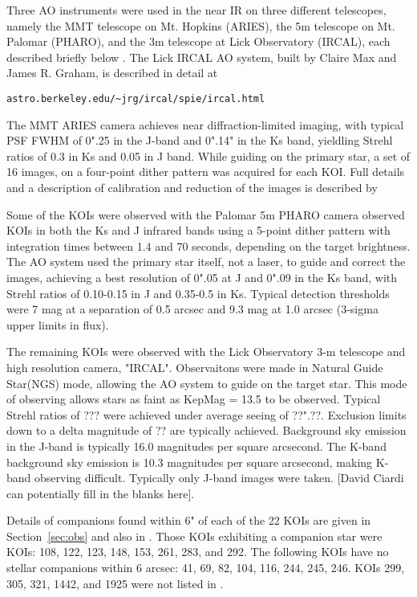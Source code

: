 \documentclass{emulateapj}
\begin{document}
Three AO instruments were used in the near IR on three different
telescopes, namely the MMT telescope on Mt. Hopkins (ARIES), the 5m
telescope on Mt. Palomar (PHARO), and the 3m telescope at Lick
Observatory (IRCAL), each described briefly below \citep{Hayward2001, Troy2003, Adams2012}.  The
Lick IRCAL AO system, built by Claire Max and James R. Graham, is
described in detail at 
\begin{verbatim}astro.berkeley.edu/~jrg/ircal/spie/ircal.html \end{verbatim}

 The MMT ARIES camera achieves near diffraction-limited imaging, with
 typical PSF FWHM of 0".25 in the J-band and 0".14" in the Ks band,
 yieldling Strehl ratios of 0.3 in Ks and 0.05 in J
 band\citep{Adams2012}.  While guiding on the primary star, a set of
 16 images, on a four-point dither pattern was acquired for each
 KOI. Full details and a description of calibration and reduction of
 the images is described by \cite{Adams2012}
  
Some of the KOIs were observed with the Palomar 5m PHARO camera
observed KOIs in both the Ks and J infrared bands using a 5-point
dither pattern with integration times between 1.4 and 70 seconds,
depending on the target brightness. The AO system used the primary
star itself, not a laser, to guide and correct the images, achieving a
best resolution of 0".05 at J and 0".09 in the Ks band, with Strehl
ratios of 0.10-0.15 in J and 0.35-0.5 in Ks.  Typical detection
thresholds were 7 mag at a separation of 0.5 arcsec and 9.3 mag at 1.0
arcsec (3-sigma upper limits in flux).
  
The remaining KOIs were observed with the Lick Observatory 3-m
 telescope and high resolution camera, "IRCAL".  Observaitons
 were made in Natural Guide Star(NGS) mode, allowing the AO
 system to guide on the target star. This mode of observing allows
 stars as faint as KepMag = 13.5 to be observed. Typical Strehl ratios
 of ??? were achieved under average seeing of ??".??. Exclusion
 limits down to a delta magnitude of ?? are typically achieved. 
Background sky emission in the J-band is typically 16.0 magnitudes
per square arcsecond. The  K-band background sky emission
is 10.3 magnitudes per square arcsecond, making K-band 
observing difficult. Typically only J-band images were taken.
 [David Ciardi can potentially fill in the blanks here].

 Details of companions found within 6" of each of the 22 KOIs are
 given in Section~\ref{sec:obs} and also in \citep{Adams2012}. Those
 KOIs exhibiting a companion star were KOIs: 108, 122, 123,
 148, 153, 261,  283, and 292. The following KOIs have no stellar
 companions within 6 arcsec: 41, 69, 82, 104, 116, 244, 245, 246.
 KOIs 299, 305, 321, 1442, and 1925 were not listed in
 \cite{Adams2012}.
  
\end{document}
